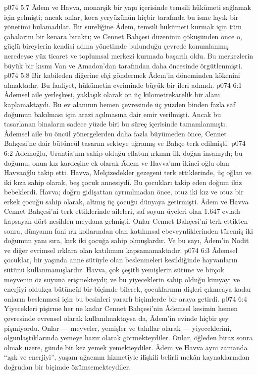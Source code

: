 \vs p074 5:7 Âdem ve Havva, monarşik bir yapı içerisinde temsili hükümeti sağlamak için gelmişti; ancak onlar, koca yeryüzünün hiçbir tarafında bu isme layık bir yönetimi bulamadılar. Bir süreliğine Âdem, temsili hükümeti kurmak için tüm çabalarını bir kenara bıraktı; ve Cennet Bahçesi düzeninin çöküşünden önce o, güçlü bireylerin kendisi adına yönetimde bulunduğu çevrede konumlanmış neredeyse yüz ticaret ve toplumsal merkezi kurmada başarılı oldu. Bu merkezlerin büyük bir kısmı Van ve Amadon’dan tarafından daha öncesinde örgütlenmişti.
\vs p074 5:8 Bir kabileden diğerine elçi göndermek Âdem’in döneminden kökenini almaktadır. Bu faaliyet, hükümetin evriminde büyük bir ileri adımdı.
\vs p074 6:1 Âdemsel aile yerleşkesi, yaklaşık olarak on üç kilometrekarelik bir alanı kaplamaktaydı. Bu ev alanının hemen çevresinde üç yüzden binden fazla saf doğumun bakılması için arazi açılmasına dair emir verilmişti. Ancak bu tasarlanan binaların sadece yüzde biri bu süreç içerisinde tamamlanmıştı. Âdemsel aile bu öncül yönergelerden daha fazla büyümeden önce, Cennet Bahçesi’ne dair bütüncül tasarım sekteye uğramış ve Bahçe terk edilmişti.
\vs p074 6:2 Ademoğlu, Urantia’nın sahip olduğu eflatun ırkının ilk doğan insanıydı; bu doğumu, onun kız kardeşine ek olarak Âdem ve Havva’nın ikinci oğlu olan Havvaoğlu takip etti. Havva, Melçizedekler gezegeni terk ettiklerinde, üç oğlan ve iki kıza sahip olarak, beş çocuk annesiydi. Bu çocukları takip eden doğum ikiz bebeklerdi. Havva; doğru gidişattan ayrınılmadan önce, otuz iki kız ve otuz bir erkek çocuğu sahip olarak, altmış üç çocuğu dünyaya getirmişti. Âdem ve Havva Cennet Bahçesi’ni terk ettiklerinde aileleri, saf soyun üyeleri olan 1.647 evladı kapsayan dört nesilden meydana gelmişti. Onlar Cennet Bahçesi’ni terk ettikten sonra, dünyanın fani ırk kollarından olan katılımsal ebeveynliklerinden türemiş iki doğumun yanı sıra, kırk iki çocuğa sahip olmuşlardır. Ve bu sayı, Âdem’in Nodit ve diğer evrimsel ırklara olan katılımını kapsamamaktadır.
\vs p074 6:3 Âdemsel çocuklar, bir yaşında anne sütüyle olan beslenmeleri kesildiğinde hayvanların sütünü kullanmamışlardır. Havva, çok çeşitli yemişlerin sütüne ve birçok meyvenin öz suyuna erişmekteydi; ve bu yiyeceklerin sahip olduğu kimyayı ve enerjiyi oldukça bütüncül bir biçimde bilerek, çocuklarının dişleri çıkıncaya kadar onların beslenmesi için bu besinleri yararlı biçimlerde bir araya getirdi.
\vs p074 6:4 Yiyecekleri pişirme her ne kadar Cennet Bahçesi’nin Âdemsel kesimin hemen çevresinde evrensel olarak kullanılmaktaysa da, Âdem’in evinde hiçbir şey pişmiyordu. Onlar --- meyveler, yemişler ve tahıllar olarak --- yiyeceklerini, olgunlaştıklarında yemeye hazır olarak görmekteydiler. Onlar, öğleden biraz sonra olmak üzere, günde bir kez yemek yemekteydiler. Âdem ve Havva aynı zamanda “ışık ve enerjiyi”, yaşam ağacının hizmetiyle ilişkili belirli mekân kaynaklarından doğrudan bir biçimde özümsemekteydiler.

